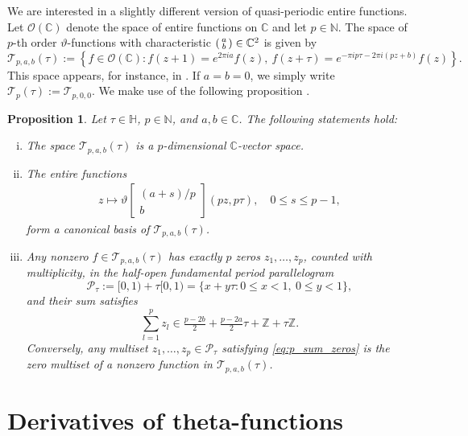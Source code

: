 \documentclass[reqno,a4paper,12pt]{amsart}
\numberwithin{equation}{section}
\newtheorem{proposition}[definition]{Proposition}
\newcommand{\N}{\mathbb N}
\newcommand{\Z}{\mathbb Z}
\newcommand{\C}{\mathbb C}
\newcommand{\HH}{\mathbb H}
\newcommand{\calT}{\mathcal T}
\newcommand{\thetac}[2]{{\vartheta\left[\begin{smallmatrix}
        #1 \\ #2
    \end{smallmatrix}\right]}}
\begin{document}
We are interested in a slightly different version of quasi-periodic entire functions.
Let $\mathcal O(\C)$ denote the space of entire functions on $\C$ and let $p\in\N$. The space of $p$-th order $\vartheta$-functions with characteristic $\begin{psmallmatrix}
    a\\b
\end{psmallmatrix}\in\C^2$
is given by 
\begin{equation}\label{eq:def:Tp}
    \calT_{p,a,b}(\tau):=
\left\{f\in\mathcal O(\C):
 f(z+1)=e^{2\pi i a}f(z),\ 
 f(z+\tau)=e^{-\pi i p\tau-2\pi i (pz+b)}f(z)
\right\}.
\end{equation}
This space appears, for instance, in \cite[Chap.~2,~Def.~7.4.]{FarkasKra2001}. If $a=b=0$, we simply write $\calT_p(\tau) := \calT_{p,0,0}$.
We make use of the following proposition \cite[Chap.~2, p.~132--134]{FarkasKra2001}.

\begin{proposition}\label{prop:elem_properties_calTp}
Let $\tau\in\HH$,  $p\in\N$, and  $a,b\in\C$. The following statements hold:
\begin{enumerate}[(i)]
    \item 
    The space $\calT_{p,a,b}(\tau)$ is a $p$-dimensional $\C$-vector space.
    \item The entire functions
    \begin{equation}
    \begin{split}
    z\mapsto
        \thetac{(a+s)/p}{b}(pz,p\tau),\quad 0\leq s\leq p-1,
    \end{split}
    \end{equation}
    form a canonical basis of $\calT_{p,a,b}(\tau)$. 
    \item Any nonzero $f\in\calT_{p,a,b}(\tau)$ has exactly $p$ zeros
$z_1,\dots,z_p$, counted with multiplicity, in the half-open fundamental
period parallelogram
\[
\mathcal P_\tau:=[0,1)+\tau[0,1)
=\{x+y\tau:0\le x<1,\ 0\le y<1\},
\]
and their sum satisfies
\begin{equation}\label{eq:p_sum_zeros}
    \sum_{l=1}^p z_l
    \in \tfrac{p-2b}{2}+\tfrac{p-2a}{2}\tau+\Z+\tau\Z.
\end{equation}
Conversely, any multiset $z_1,\dots,z_p\in\mathcal P_\tau$ satisfying
\eqref{eq:p_sum_zeros} is the zero multiset of a nonzero function in
$\calT_{p,a,b}(\tau)$.
\end{enumerate}  
\end{proposition}


\section{Derivatives of theta-functions}\label{sec:thetaD}
\end{document}
